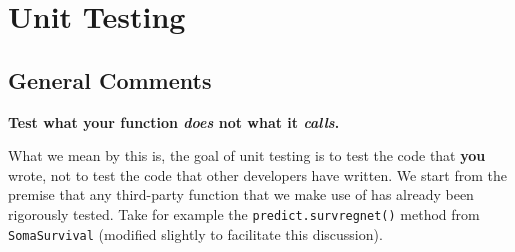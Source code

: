 \documentclass[
]{book}
\begin{document}
\hypertarget{unit-testing}{%
\chapter{Unit Testing}\label{unit-testing}}

\hypertarget{general-comments-1}{%
\section{General Comments}\label{general-comments-1}}

\textbf{Test what your function \emph{does} not what it \emph{calls}.}

What we mean by this is, the goal of unit testing is to test the code that \textbf{you} wrote, not to test the code that other developers have written. We start from the premise that any third-party function that we make use of has already been rigorously tested. Take for example the \texttt{predict.survregnet()} method from \texttt{SomaSurvival} (modified slightly to facilitate this discussion).
\end{document}
